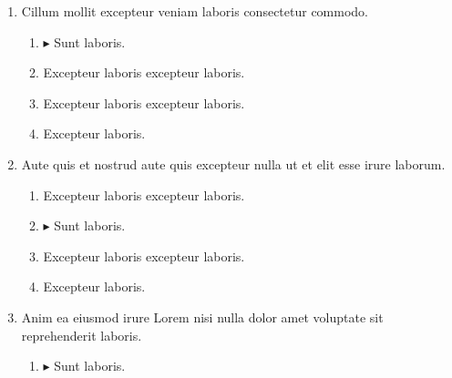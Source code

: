 \documentclass[a4paper,12pt]{article}
\begin{document}
\begin{enumerate}[label=\textbf{\arabic*.}]
\begin{multicols}{2}
\begin{enumerate}
		\item  Excepteur laboris excepteur laboris.
  
		\item  Excepteur laboris excepteur laboris.
    
		\item  Excepteur laboris.
    
	\end{enumerate}

\end{multicols}
\item Cillum mollit excepteur veniam laboris consectetur commodo.
\begin{multicols}{2}
	\begin{enumerate}
		\item $\blacktriangleright$  Sunt laboris.
    
		\item  Excepteur laboris excepteur laboris.
    
		\item  Excepteur laboris excepteur laboris.
  
		\item  Excepteur laboris.
    
	\end{enumerate}

\end{multicols}
\item Aute quis et nostrud aute quis excepteur nulla ut et elit esse irure laborum.
\begin{multicols}{2}
	\begin{enumerate}
		\item  Excepteur laboris excepteur laboris.
  
		\item $\blacktriangleright$  Sunt laboris.
    
		\item  Excepteur laboris excepteur laboris.
    
		\item  Excepteur laboris.
    
	\end{enumerate}

\end{multicols}
\item Anim ea eiusmod irure Lorem nisi nulla dolor amet voluptate sit reprehenderit laboris.
\begin{multicols}{2}
	\begin{enumerate}
		\item $\blacktriangleright$  Sunt laboris.
    

\end{enumerate}
\end{multicols}
\end{enumerate}
\end{document}
